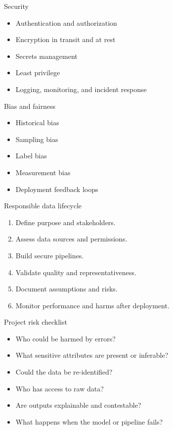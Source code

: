 \documentclass[aspectratio=43,12pt]{beamer}
\begin{document}
\begin{frame}{Security}
\begin{itemize}
  \item Authentication and authorization
  \item Encryption in transit and at rest
  \item Secrets management
  \item Least privilege
  \item Logging, monitoring, and incident response
\end{itemize}
\end{frame}

\begin{frame}{Bias and fairness}
\begin{itemize}
  \item Historical bias
  \item Sampling bias
  \item Label bias
  \item Measurement bias
  \item Deployment feedback loops
\end{itemize}
\end{frame}

\begin{frame}{Responsible data lifecycle}
\begin{enumerate}
  \item Define purpose and stakeholders.
  \item Assess data sources and permissions.
  \item Build secure pipelines.
  \item Validate quality and representativeness.
  \item Document assumptions and risks.
  \item Monitor performance and harms after deployment.
\end{enumerate}
\end{frame}

\begin{frame}{Project risk checklist}
\begin{itemize}
  \item Who could be harmed by errors?
  \item What sensitive attributes are present or inferable?
  \item Could the data be re-identified?
  \item Who has access to raw data?
  \item Are outputs explainable and contestable?
  \item What happens when the model or pipeline fails?
\end{itemize}
\end{frame}
\end{document}
